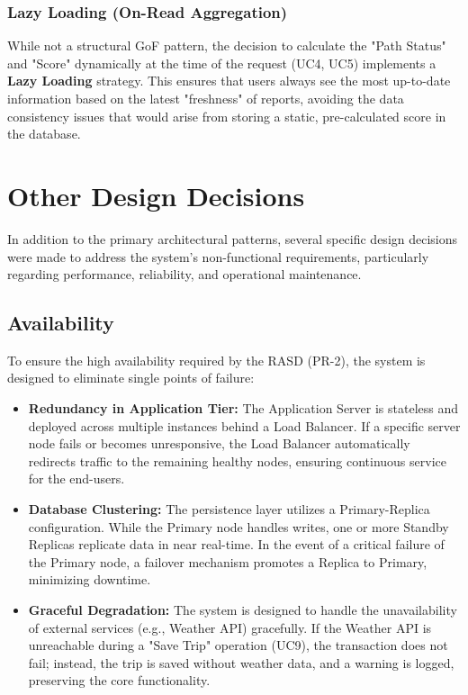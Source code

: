 \subsubsection{Lazy Loading (On-Read Aggregation)}
While not a structural GoF pattern, the decision to calculate the "Path Status" and "Score" dynamically at the time of the request (UC4, UC5) implements a \textbf{Lazy Loading} strategy. This ensures that users always see the most up-to-date information based on the latest "freshness" of reports, avoiding the data consistency issues that would arise from storing a static, pre-calculated score in the database.

\section{Other Design Decisions}
\label{sec:other_design_decisions}

In addition to the primary architectural patterns, several specific design decisions were made to address the system's non-functional requirements, particularly regarding performance, reliability, and operational maintenance.

\subsection{Availability}
To ensure the high availability required by the RASD (PR-2), the system is designed to eliminate single points of failure:
\begin{itemize}
    \item \textbf{Redundancy in Application Tier:} The Application Server is stateless and deployed across multiple instances behind a Load Balancer. If a specific server node fails or becomes unresponsive, the Load Balancer automatically redirects traffic to the remaining healthy nodes, ensuring continuous service for the end-users.
    \item \textbf{Database Clustering:} The persistence layer utilizes a Primary-Replica configuration. While the Primary node handles writes, one or more Standby Replicas replicate data in near real-time. In the event of a critical failure of the Primary node, a failover mechanism promotes a Replica to Primary, minimizing downtime.
    \item \textbf{Graceful Degradation:} The system is designed to handle the unavailability of external services (e.g., Weather API) gracefully. If the Weather API is unreachable during a "Save Trip" operation (UC9), the transaction does not fail; instead, the trip is saved without weather data, and a warning is logged, preserving the core functionality.
\end{itemize}

